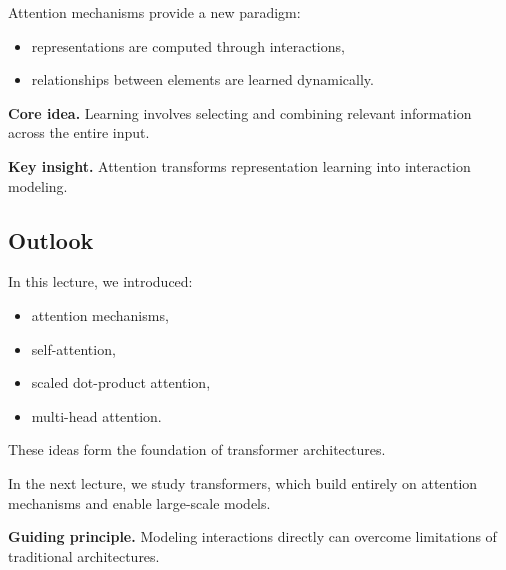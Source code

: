 Attention mechanisms provide a new paradigm:

\begin{itemize}
    \item representations are computed through interactions,
    \item relationships between elements are learned dynamically.
\end{itemize}

\medskip

\noindent
\textbf{Core idea.}  
Learning involves selecting and combining relevant information across the entire input.

\medskip

\noindent
\textbf{Key insight.}  
Attention transforms representation learning into interaction modeling.

\subsection{Outlook}

In this lecture, we introduced:

\begin{itemize}
    \item attention mechanisms,
    \item self-attention,
    \item scaled dot-product attention,
    \item multi-head attention.
\end{itemize}

\medskip

\noindent
These ideas form the foundation of transformer architectures.

\medskip

\noindent
In the next lecture, we study transformers, which build entirely on attention mechanisms and enable large-scale models.

\medskip

\noindent
\textbf{Guiding principle.}  
Modeling interactions directly can overcome limitations of traditional architectures.